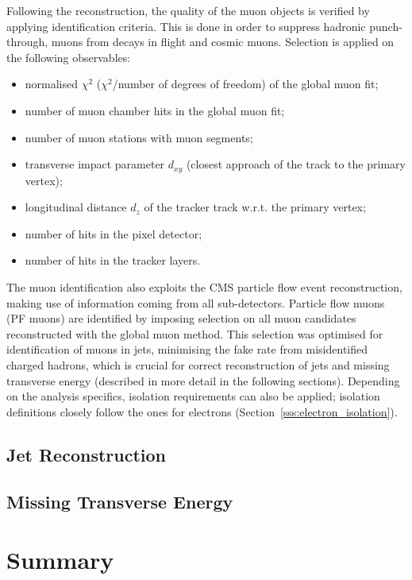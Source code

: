 Following the reconstruction, the quality of the muon objects is verified by applying identification criteria. This is
done in order to suppress hadronic punch-through, muons from decays in flight and cosmic muons. Selection is applied on
the following observables:
\begin{itemize}
  \item normalised $\chi^2$ ($\chi^2$/number of degrees of freedom) of the global muon fit;
  \item number of muon chamber hits in the global muon fit;
  \item number of muon stations with muon segments;
  \item transverse impact parameter $d_{xy}$ (closest approach of the track to the primary vertex);
  \item longitudinal distance $d_z$ of the tracker track w.r.t. the primary vertex;
  \item number of hits in the pixel detector;
  \item number of hits in the tracker layers.
\end{itemize}

The muon identification also exploits the CMS particle flow event reconstruction, making use of information coming from
all sub-detectors. Particle flow muons (PF muons) are identified by imposing selection on all muon candidates
reconstructed with the global muon method. This selection was optimised for identification of muons in jets, minimising
the fake rate from misidentified charged hadrons, which is crucial for correct reconstruction of jets and missing
transverse energy (described in more detail in the following sections). Depending on the analysis specifics, isolation
requirements can also be applied; isolation definitions closely follow the ones for electrons
(Section~\ref{sss:electron_isolation}).


\subsection{Jet Reconstruction}
\label{ss:jet_reconstruction}

\subsection{Missing Transverse Energy}
\label{ss:MET_reconstruction}

\section{Summary}



